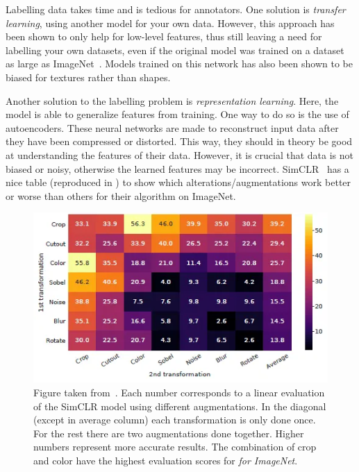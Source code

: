 \documentclass[10pt,twocolumn,letterpaper]{article}
\begin{document}
Labelling data takes time and is tedious for annotators. One solution is \textit{transfer learning}, using another model for your own data. However, this approach has been shown to only help for low-level features, thus still leaving a need for labelling your own datasets, even if the original model was trained on a dataset as large as ImageNet~\cite{imageNet}. Models trained on this network has also been shown to be biased for textures rather than shapes. %

Another solution to the labelling problem is \textit{representation learning}. Here, the model is able to generalize features from training. One way to do so is the use of autoencoders. These neural networks are made to reconstruct input data after they have been compressed or distorted. This way, they should in theory be good at understanding the features of their data. However, it is crucial that data is not biased or noisy, otherwise the learned features may be incorrect. SimCLR~\cite{simCLR} has a nice table (reproduced in ) to show which alterations/augmentations work better or worse than others for their algorithm on ImageNet.

\begin{figure}
  \includegraphics[scale=.5]{simCLR.png}
  \caption{Figure taken from~\cite{simCLR}. Each number corresponds to a linear evaluation of the SimCLR model using different augmentations. In the diagonal (except in average column) each transformation is only done once. For the rest there are two augmentations done together. Higher numbers represent more accurate results. The combination of crop and color have the highest evaluation scores for \textit{for ImageNet}.}
\label{fig:simCLR}
\end{figure}
\end{document}
